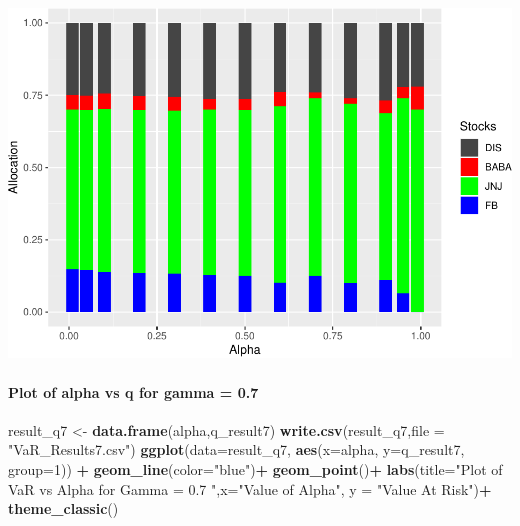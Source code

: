 \documentclass[]{article}
\newenvironment{Shaded}{\begin{snugshade}}{\end{snugshade}}
\newcommand{\KeywordTok}[1]{\textcolor[rgb]{0.13,0.29,0.53}{\textbf{#1}}}
\newcommand{\DataTypeTok}[1]{\textcolor[rgb]{0.13,0.29,0.53}{#1}}
\newcommand{\DecValTok}[1]{\textcolor[rgb]{0.00,0.00,0.81}{#1}}
\newcommand{\StringTok}[1]{\textcolor[rgb]{0.31,0.60,0.02}{#1}}
\newcommand{\OperatorTok}[1]{\textcolor[rgb]{0.81,0.36,0.00}{\textbf{#1}}}
\newcommand{\NormalTok}[1]{#1}
\let\oldparagraph\paragraph
\renewcommand{\paragraph}[1]{\oldparagraph{#1}\mbox{}}
\begin{document}
\includegraphics{Integrated_Management_Formulation_Model_files/figure-latex/unnamed-chunk-18-2.pdf}

\paragraph{Plot of alpha vs q for gamma =
0.7}\label{plot-of-alpha-vs-q-for-gamma-0.7}

\begin{Shaded}
\begin{Highlighting}[]
\NormalTok{result_q7 <-}\StringTok{ }\KeywordTok{data.frame}\NormalTok{(alpha,q_result7)}
\KeywordTok{write.csv}\NormalTok{(result_q7,}\DataTypeTok{file =} \StringTok{"VaR_Results7.csv"}\NormalTok{)}
\KeywordTok{ggplot}\NormalTok{(}\DataTypeTok{data=}\NormalTok{result_q7, }\KeywordTok{aes}\NormalTok{(}\DataTypeTok{x=}\NormalTok{alpha, }\DataTypeTok{y=}\NormalTok{q_result7, }\DataTypeTok{group=}\DecValTok{1}\NormalTok{)) }\OperatorTok{+}
\StringTok{  }\KeywordTok{geom_line}\NormalTok{(}\DataTypeTok{color=}\StringTok{"blue"}\NormalTok{)}\OperatorTok{+}
\StringTok{  }\KeywordTok{geom_point}\NormalTok{()}\OperatorTok{+}
\StringTok{  }\KeywordTok{labs}\NormalTok{(}\DataTypeTok{title=}\StringTok{"Plot of VaR vs Alpha for Gamma = 0.7 "}\NormalTok{,}\DataTypeTok{x=}\StringTok{"Value of Alpha"}\NormalTok{, }\DataTypeTok{y =} \StringTok{"Value At Risk"}\NormalTok{)}\OperatorTok{+}
\StringTok{  }\KeywordTok{theme_classic}\NormalTok{()}
\end{Highlighting}
\end{Shaded}
\end{document}
